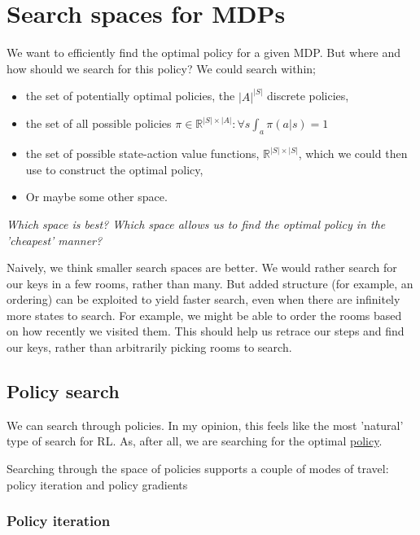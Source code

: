 \section{Search spaces for MDPs}\label{search-spaces-mdps}

We want to efficiently find the optimal policy for a given MDP. But where and how should we
search for this policy? We could search within;

\begin{itemize}
\tightlist
  \item the set of potentially optimal policies, the $|A|^{|S|}$ discrete policies,
  \item the set of all possible policies $\pi \in \mathbb R^{|S| \times |A|}: \forall s \int_a \pi(a|s) = 1$
  \item the set of possible state-action value functions, $\mathbb R^{|S|\times|S|}$,
  which we could then use to construct the optimal policy,
  \item Or maybe some other space.
\end{itemize}

\begin{displayquote}
  \textit{Which space is best? Which space allows us to find the optimal policy in the 'cheapest' manner?}
\end{displayquote}

Naively, we think smaller search spaces are better. We would rather
search for our keys in a few rooms, rather than many. But added
structure (for example, an ordering) can be exploited to yield faster
search, even when there are infinitely more states to search. For example,
we might be able to order the rooms based on how recently we visited them.
This should help us retrace our steps and find our keys, rather than arbitrarily
picking rooms to search.

\subsection{Policy search}

We can search through policies. In my opinion, this feels like the most 'natural' type of search for RL.
As, after all, we are searching for the optimal \underline{policy}.

Searching through the space of policies supports a couple of modes of travel:
policy iteration and policy gradients

\subsubsection{Policy iteration}

